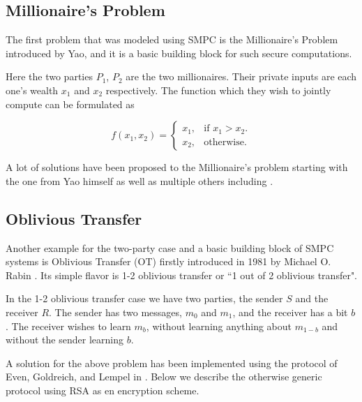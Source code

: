 \subsection{Millionaire's Problem}
The first problem that was modeled using SMPC is the Millionaire's Problem introduced by Yao, and it is a basic building block for such secure computations.

Here the two parties $P_1$, $P_2$ are the two millionaires.
Their private inputs are each one’s wealth $x_1$ and $x_2$ respectively.
The function which they wish to jointly compute can be formulated as

\begin{equation}
  f(x_1, x_2)=\begin{cases}
    x_1, & \text{if $x_1 > x_2$}.\\
    x_2, & \text{otherwise}.
  \end{cases}
\end{equation}

A lot of solutions have been proposed to the Millionaire's problem starting with the one from Yao himself \cite{yao1982protocols} as well as multiple others including \cite{ioannidis2003efficient, lin2005efficient}.

\subsection{Oblivious Transfer}
Another example for the two-party case and a basic building block of SMPC systems is Oblivious Transfer (OT) firstly introduced in 1981 by Michael O. Rabin \cite{rabin2005exchange}.
Its simple flavor is 1-2 oblivious transfer or ``1 out of 2 oblivious transfer".


In the 1-2 oblivious transfer case we have two parties, the sender $S$ and the receiver $R$.
The sender has two messages, $m_0$ and $m_1$, and the receiver has a bit $b$.
The receiver wishes to learn $m_b$, without learning anything about $m_{1-b}$ and without the sender learning $b$.

A solution for the above problem has been implemented using the protocol of Even, Goldreich, and Lempel in \cite{even1985randomized}.
Below we describe the otherwise generic protocol using RSA as en encryption scheme.

